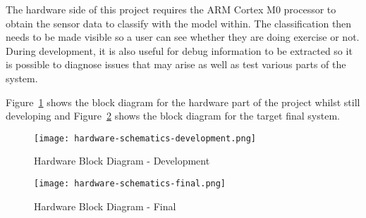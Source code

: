 
The hardware side of this project requires the ARM Cortex M0 processor to obtain the sensor data to classify with the model within. The classification then needs to be made visible so a user can see whether they are doing exercise or not. During development, it is also useful for debug information to be extracted so it is possible to diagnose issues that may arise as well as test various parts of the system. 

Figure~\ref{fig:hardware_schematic_development} shows the block diagram for the hardware part of the project whilst still developing and Figure~\ref{fig:hardware_schematic_final} shows the block diagram for the target final system.

\begin{figure}
	\centering
	\texttt{[image: hardware-schematics-development.png]}
	\caption{Hardware Block Diagram - Development}
	\label{fig:hardware_schematic_development}
\end{figure}

\begin{figure}
	\centering
	\texttt{[image: hardware-schematics-final.png]}
	\caption{Hardware Block Diagram - Final}
	\label{fig:hardware_schematic_final}
\end{figure}